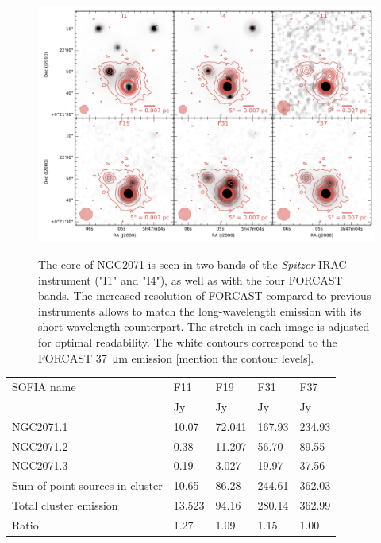 \begin{landscape}
\begin{figure}
\begin{center}
\includegraphics[width=1.4\textwidth]{Figures/NGC2071_mosaic.png}
\label{fig:NGC2071_mosaic}

\caption{The core of NGC2071 is seen in two bands of the \textit{Spitzer} IRAC instrument ("I1" and "I4"), as well as with the four FORCAST bands. The increased resolution of FORCAST compared to previous instruments allows to match the long-wavelength emission with its short wavelength counterpart. The stretch in each image is adjusted for optimal readability. The white contours correspond to the FORCAST \SI{37}{\micro\meter} emission [mention the contour levels]. }
\end{center}
\end{figure}
\end{landscape}


\renewcommand{\arraystretch}{1.5}
\def\labelitemi{--}
\begin{table}[!h]
\scriptsize
\caption[Sources in NGC2071's dense core]{Sources in the densest region of NGC2071.}
\label{tab:IRAS20050sum}
\vspace{-0.5cm}
\begin{longtable}{lP{2cm}P{2cm}P{2cm}P{2cm}}
\toprule																			
SOFIA name	&	F11	&	F19	&	F31	&	F37	\\
	&	Jy	&	Jy	&	Jy	&	Jy	\\
\midrule									
NGC2071.1	&	10.07	&	72.041	&	167.93	&	234.93	\\
NGC2071.2	&	0.38	&	11.207	&	56.70	&	89.55	\\
NGC2071.3	&	0.19	&	3.027	&	19.97	&	37.56	\\
\midrule									
Sum of point sources in cluster	&	10.65	&	86.28	&	244.61	&	362.03	\\
Total cluster emission	&	13.523	&	94.16	&	280.14	&	362.99	\\
Ratio	&	1.27	&	1.09	&	1.15	&	1.00	\\
\bottomrule					
	\end{longtable} 
\end{table}



